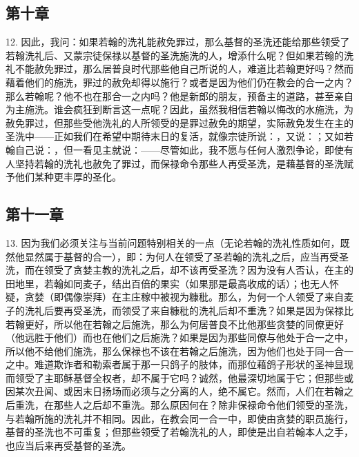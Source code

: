 
\subsection{第十章}

12. 因此，我问：如果若翰的洗礼能赦免罪过，那么基督的圣洗还能给那些领受了若翰洗礼后、又蒙宗徒保禄以基督的圣洗施洗的人，增添什么呢？但如果若翰的洗礼不能赦免罪过，那么居普良时代那些他自己所说的人，难道比若翰更好吗？然而藉着他们的施洗，罪过的赦免却得以施行？或者是因为他们仍在教会的合一之内？那么若翰呢？他不也在那合一之内吗？他是新郎的朋友，预备主的道路，甚至亲自为主施洗。谁会疯狂到断言这一点呢？因此，虽然我相信若翰以悔改的水施洗，为赦免罪过，但那些受他洗礼的人所领受的是罪过赦免的期望，实际赦免发生在主的圣洗中——正如我们在希望中期待末日的复活，就像宗徒所说：，又说：；又如若翰自己说：，但一看见主就说：——尽管如此，我不愿与任何人激烈争论，即使有人坚持若翰的洗礼也赦免了罪过，而保禄命令那些人再受圣洗，是藉基督的圣洗赋予他们某种更丰厚的圣化。\par


\subsection{第十一章}

13. 因为我们必须关注与当前问题特别相关的一点（无论若翰的洗礼性质如何，既然他显然属于基督的合一），即：为何人在领受了圣若翰的洗礼之后，应当再受圣洗，而在领受了贪婪主教的洗礼之后，却不该再受圣洗？因为没有人否认，在主的田地里，若翰如同麦子，结出百倍的果实（如果那是最高收成的话）；也无人怀疑，贪婪（即偶像崇拜）在主庄稼中被视为糠秕。那么，为何一个人领受了来自麦子的洗礼后要再受圣洗，而领受了来自糠秕的洗礼后却不重洗？如果是因为保禄比若翰更好，所以他在若翰之后施洗，那么为何居普良不比他那些贪婪的同僚更好（他远胜于他们）而也在他们之后施洗？如果是因为那些同僚与他处于合一之中，所以他不给他们施洗，那么保禄也不该在若翰之后施洗，因为他们也处于同一合一之中。难道欺诈者和勒索者属于那一只鸽子的肢体，而那位藉鸽子形状的圣神显现而领受了主耶稣基督全权者，却不属于它吗？诚然，他最深切地属于它；但那些或因某次丑闻、或因末日扬场而必须与之分离的人，绝不属它。然而，人们在若翰之后重洗，在那些人之后却不重洗。那么原因何在？除非保禄命令他们领受的圣洗，与若翰所施的洗礼并不相同。因此，在教会同一合一中，即使由贪婪的职员施行，基督的圣洗也不可重复；但那些领受了若翰洗礼的人，即使是出自若翰本人之手，也应当后来再受基督的圣洗。\par

